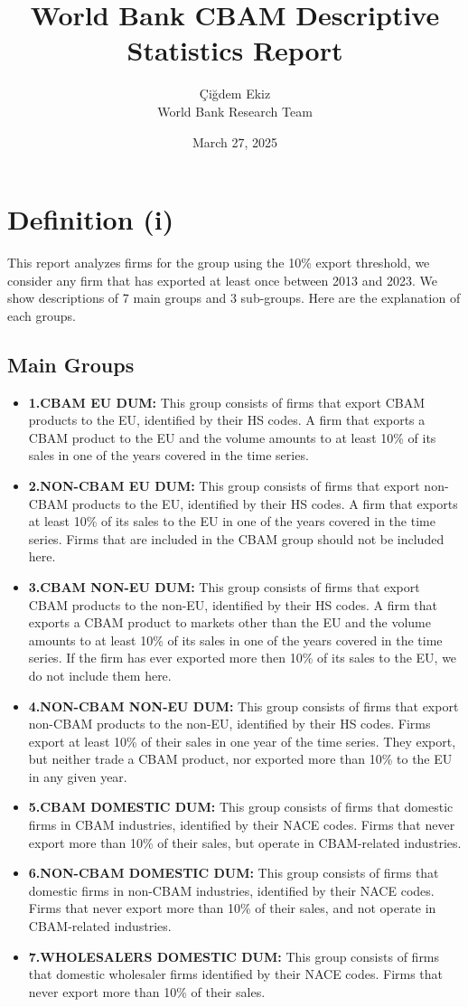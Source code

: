 \documentclass{article}
\title{World Bank CBAM Descriptive Statistics Report}
\author{Çiğdem Ekiz \\ World Bank Research Team}
\date{March 27, 2025}
\begin{document}
\maketitle

\section*{Definition (i)}
This report analyzes firms for the group using the 10\% export threshold, we consider any firm that has exported at least once between 2013 and 2023. We show descriptions of 7 main groups and 3 sub-groups. Here are the explanation of each groups.

\subsection*{Main Groups}
\begin{itemize}
    \item \textbf{1.CBAM EU DUM:} This group consists of firms that export CBAM products to the EU, identified by their HS codes. A firm that exports a CBAM product to the EU and the volume amounts to at least 10\% of its sales in one of the years covered in the time series.
    \item \textbf{2.NON-CBAM EU DUM:} This group consists of firms that export non-CBAM products to the EU, identified by their HS codes. A firm that exports at least 10\% of its sales to the EU in one of the years covered in the time series. Firms that are included in the CBAM group should not be included here.
    \item \textbf{3.CBAM NON-EU DUM:} This group consists of firms that export CBAM products to the non-EU, identified by their HS codes. A firm that exports a CBAM product to markets other than the EU and the volume amounts to at least 10\% of its sales in one of the years covered in the time series. If the firm has ever exported more then 10\% of its sales to the EU, we do not include them here.
    \item \textbf{4.NON-CBAM NON-EU DUM:} This group consists of firms that export non-CBAM products to the non-EU, identified by their HS codes. Firms export at least 10\% of their sales in one year of the time series. They export, but neither trade a CBAM product, nor exported more than 10\% to the EU in any given year.
    \item \textbf{5.CBAM DOMESTIC DUM:} This group consists of firms that domestic firms in CBAM industries, identified by their NACE codes. Firms that never export more than 10\% of their sales, but operate in CBAM-related industries.
    \item \textbf{6.NON-CBAM DOMESTIC DUM:} This group consists of firms that domestic firms in non-CBAM industries, identified by their NACE codes. Firms that never export more than 10\% of their sales, and not operate in CBAM-related industries.
    \item \textbf{7.WHOLESALERS  DOMESTIC DUM:} This group consists of firms that domestic wholesaler firms identified by their NACE codes. Firms that never export more than 10\% of their sales.
\end{itemize}
\end{document}
